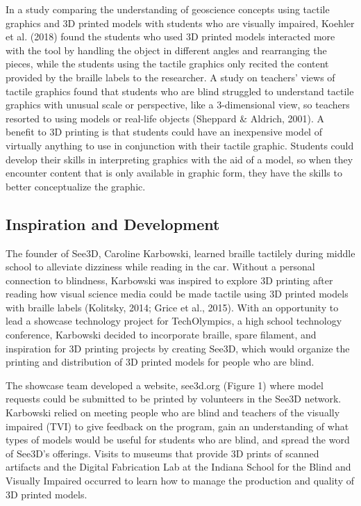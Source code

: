 \documentclass[11.5pt]{sig-alternate} %
\begin{document}
\begin{large}
In a study comparing the understanding of geoscience concepts using tactile graphics and 3D printed models with students who are visually impaired, Koehler et al. (2018) found the students who used 3D printed models interacted more with the tool by handling the object in different angles and rearranging the pieces, while the students using the tactile graphics only recited the content provided by the braille labels to the researcher. A study on teachers’ views of tactile graphics found that students who are blind struggled to understand tactile graphics with unusual scale or perspective, like a 3-dimensional view, so teachers resorted to using models or real-life objects (Sheppard \& Aldrich, 2001). A benefit to 3D printing is that students could have an inexpensive model of virtually anything to use in conjunction with their tactile graphic. Students could develop their skills in interpreting graphics with the aid of a model, so when they encounter content that is only available in graphic form, they have the skills to better conceptualize the graphic. 

\subsection*{Inspiration and Development}

The founder of See3D, Caroline Karbowski, learn\-ed braille tactilely during middle school to alleviate dizziness while reading in the car. Without a personal connection to blindness, Karbowski was inspired to explore 3D printing after reading how visual science media could be made tactile using 3D printed models with braille labels (Kolitsky, 2014; Grice et al., 2015). With an opportunity to lead a showcase technology project for TechOlympics, a high school technology conference, Karbowski decided to incorporate braille, spare filament, and inspiration for 3D printing projects by creating See3D, which would organize the printing and distribution of 3D printed models for people who are blind. 

The showcase team developed a website, see3d.org (Figure 1) where model requests could be submitted to be printed by volunteers in the See3D network. Karbowski relied on meeting people who are blind and teachers of the visually impaired (TVI) to give feedback on the program, gain an understanding of what types of models would be useful for students who are blind, and spread the word of See3D’s offerings. Visits to museums that provide 3D prints of scanned artifacts and the Digital Fabrication Lab at the Indiana School for the Blind and Visually Impaired occurred to learn how to manage the production and quality of 3D printed models.


\end{large}
\end{document}
